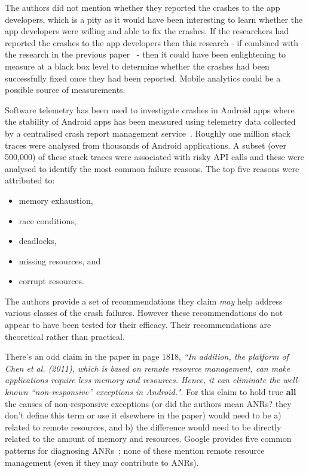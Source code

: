 The authors did not mention whether they reported the crashes to the app developers, which is a pity as it would have been interesting to learn whether the app developers were willing and able to fix the crashes. If the researchers had reported the crashes to the app developers then this research - if combined with the research in the previous paper~ - then it could have been enlightening to measure at a black box level to determine whether the crashes had been successfully fixed once they had been reported. Mobile analytics could be a possible source of measurements.

Software telemetry has been used to investigate crashes in Android apps where the stability of Android apps has been measured using telemetry data collected by a centralised crash report management service~. Roughly one million stack traces were analysed from thousands of Android applications. A subset (over 500,000) of these stack traces were associated with risky API calls and these were analysed to identify the most common failure reasons. The top five reasons were attributed to:
    \begin{itemize}
        \item memory exhaustion,
        \item race conditions,
        \item deadlocks,
        \item missing resources, and
        \item corrupt resources.
    \end{itemize}
    
The authors provide a set of recommendations they claim \emph{may} help address various classes of the crash failures. However these recommendations do not appear to have been tested for their efficacy. Their recommendations are theoretical rather than practical. 

There's an odd claim in the paper in page 1818, \emph{``In addition, the platform of Chen et al. (2011), which is based on remote resource management, can make applications require less memory and resources. Hence, it can eliminate the well-known “non-responsive” exceptions in Android."}. For this claim to hold true \textbf{all} the causes of non-responsive exceptions (or did the authors mean ANRs? they don't define this term or use it elsewhere in the paper) would need to be a) related to remote resources, and b) the difference would need to be directly related to the amount of memory and resources. Google provides five common patterns for diagnosing ANRs~; none of these mention remote resource management (even if they may contribute to ANRs). 

